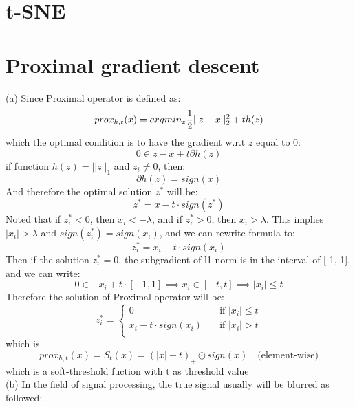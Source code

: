 \documentclass{article}
\begin{document}
\section{t-SNE}
\section{Proximal gradient descent}
(a) Since Proximal operator is defined as:
\begin{equation}
prox_{h,t}(x) = argmin_z{1\over2}||z-x||_2^2 + th(z)
\end{equation}
which the optimal condition is to have the gradient w.r.t $z$ equal to 0:
\begin{equation}
0 \in z-x+t\partial h(z)
\end{equation}
if function $h(z)=||z||_1$ and $z_i \neq 0$, then:
\begin{equation}
\partial h(z) = sign(x)
\end{equation}
And therefore the optimal solution $z^\ast$ will be:
\begin{equation}
z^\ast = x - t\cdot sign(z^\ast)
\end{equation}
Noted that if $z_i^\ast<0$, then $x_i<-\lambda$, and if $z_i^\ast>0$, then $x_i>\lambda$. This implies $|x_i|>\lambda$ and $sign(z_i^\ast) = sign(x_i)$, and we can rewrite formula to:
\begin{equation}
z_i^\ast = x_i - t\cdot sign(x_i)
\end{equation}
Then if the solution $z_i^\ast=0$, the subgradient of l1-norm is in the interval of [-1, 1], and we can write:
\begin{equation}
0 \in -x_i + t \cdot [-1,1] \implies x_i \in [-t, t] \implies |x_i| \leq t
\end{equation}
Therefore the solution of Proximal operator will be:
\begin{equation}
z_i^\ast = \begin{cases}
    0       & \quad \text{if } |x_i|\leq t\\
    x_i-t \cdot sign(x_i)  & \quad \text{if } |x_i|>t\\
  \end{cases}
\end{equation}
which is
\begin{equation}
prox_{h,t}(x) = S_t(x) = (|x|-t)_+\odot sign(x) \quad \text{(element-wise)}
\end{equation}
which is a soft-threshold fuction with t as threshold value\\
(b) In the field of signal processing, the true signal usually will be blurred as followed:
\end{document}
